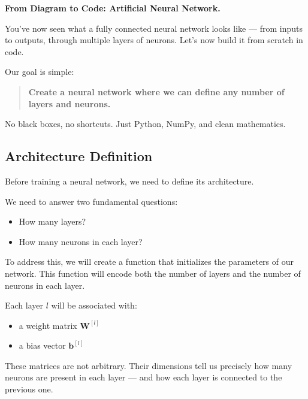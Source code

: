 \documentclass[11pt]{article}
\begin{document}
\vspace{2em}
\begin{center}
\LARGE \textbf{From Diagram to Code: Artificial Neural Network.}
\end{center}

You’ve now seen what a fully connected neural network looks like —  
from inputs to outputs, through multiple layers of neurons.  
Let’s now build it from scratch in code.

Our goal is simple:

\begin{quote}
\textbf{Create a neural network where we can define any number of layers and neurons.}
\end{quote}

No black boxes, no shortcuts.  
Just Python, NumPy, and clean mathematics.

\subsection*{Architecture Definition}

Before training a neural network, we need to define its architecture.

\bigskip

We need to answer two fundamental questions:

\begin{itemize}
  \item How many layers?
  \item How many neurons in each layer?
\end{itemize}

\medskip

To address this, we will create a function that initializes the parameters of our network.  
This function will encode both the number of layers and the number of neurons in each layer.

\medskip

Each layer $l$ will be associated with:
\begin{itemize}
  \item a weight matrix $\mathbf{W}^{[l]}$
  \item a bias vector $\mathbf{b}^{[l]}$
\end{itemize}

\medskip

These matrices are not arbitrary.  
Their dimensions tell us precisely how many neurons are present in each layer — and how each layer is connected to the previous one.
\end{document}
